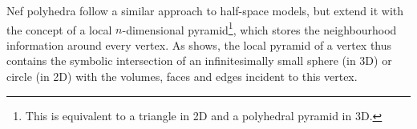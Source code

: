 Nef polyhedra \citep{Nef78,Bieri88} follow a similar approach to half-space models, but extend it with the concept of a local $n$-dimensional pyramid\footnote{This is equivalent to a triangle in 2D and a polyhedral pyramid in 3D.}, which stores the neighbourhood information around every vertex.
As  shows, the local pyramid of a vertex thus contains the symbolic intersection of an infinitesimally small sphere (in 3D) or circle (in 2D) with the volumes, faces and edges incident to this vertex.
